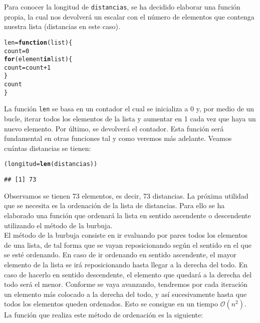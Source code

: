 \documentclass[12pt]{report}\usepackage[]{graphicx}\usepackage[dvipsnames]{xcolor}
\makeatletter
\newcommand{\hlnum}[1]{\textcolor[rgb]{0.686,0.059,0.569}{#1}}%
\newcommand{\hlopt}[1]{\textcolor[rgb]{0,0,0}{#1}}%
\newcommand{\hlstd}[1]{\textcolor[rgb]{0.345,0.345,0.345}{#1}}%
\newcommand{\hlkwa}[1]{\textcolor[rgb]{0.161,0.373,0.58}{\textbf{#1}}}%
\newcommand{\hlkwb}[1]{\textcolor[rgb]{0.69,0.353,0.396}{#1}}%
\newcommand{\hlkwc}[1]{\textcolor[rgb]{0.333,0.667,0.333}{#1}}%
\newcommand{\hlkwd}[1]{\textcolor[rgb]{0.737,0.353,0.396}{\textbf{#1}}}%
\newenvironment{kframe}{%
 \def\at@end@of@kframe{}%
 \ifinner\ifhmode%
  \def\at@end@of@kframe{\end{minipage}}%
  \begin{minipage}{\columnwidth}%
 \fi\fi%
 \def\FrameCommand##1{\hskip\@totalleftmargin \hskip-\fboxsep
 \colorbox{shadecolor}{##1}\hskip-\fboxsep
     \hskip-\linewidth \hskip-\@totalleftmargin \hskip\columnwidth}%
 \MakeFramed {\advance\hsize-\width
   \@totalleftmargin\z@ \linewidth\hsize
   \@setminipage}}%
 {\par\unskip\endMakeFramed%
 \at@end@of@kframe}
\newenvironment{knitrout}{}{} %
\makeatother
\begin{document}
			Para conocer la longitud de \texttt{distancias}, se ha decidido elaborar una función propia, la cual nos devolverá un escalar con el número de elementos que contenga nuestra lista (distancias en este caso). 
			
\begin{knitrout}
\color{fgcolor}\begin{kframe}
\begin{alltt}
\hlstd{len} \hlkwb{=} \hlkwa{function}\hlstd{(}\hlkwc{list}\hlstd{)\{}
        \hlstd{count} \hlkwb{=} \hlnum{0}
        \hlkwa{for} \hlstd{(element} \hlkwa{in} \hlstd{list)\{}
                \hlstd{count} \hlkwb{=} \hlstd{count} \hlopt{+} \hlnum{1}
        \hlstd{\}}
        \hlstd{count}
\hlstd{\}}
\end{alltt}
\end{kframe}
\end{knitrout}
			
			La función \texttt{len} se basa en un contador el cual se inicializa a 0 y, por medio de un bucle, iterar todos los elementos de la lista y aumentar en 1 cada vez que haya un nuevo elemento. Por último, se devolverá el contador. Esta función será fundamental en otras funciones tal y como veremos más adelante. Veamos cuántas distancias se tienen:
			
\begin{knitrout}
\color{fgcolor}\begin{kframe}
\begin{alltt}
\hlstd{(longitud} \hlkwb{=} \hlkwd{len}\hlstd{(distancias))}
\end{alltt}
\begin{verbatim}
## [1] 73
\end{verbatim}
\end{kframe}
\end{knitrout}
			
			Observamos se tienen 73 elementos, es decir, 73 distancias. La próxima utilidad que se necesita es la ordenación de la lista de distancias. Para ello se ha elaborado una función que ordenará la lista en sentido ascendente o descendente utilizando el método de la burbuja. \\
			
			El método de la burbuja consiste en ir evaluando por pares todos los elementos de una lista, de tal forma que se vayan reposicionando según el sentido en el que se esté ordenando. En caso de ir ordenando en sentido ascendente, el mayor elemento de la lista se irá reposicionando hasta llegar a la derecha del todo. En caso de hacerlo en sentido descendente, el elemento que quedará a la derecha del todo será el menor. Conforme se vaya avanzando, tendremos por cada iteración un elemento más colocado a la derecha del todo, y así sucesivamente hasta que todos los elementos queden ordenados. Esto se consigue en un tiempo $\mathcal{O}(n^2)$. La función que realiza este método de ordenación es la siguiente:
			
\end{document}
